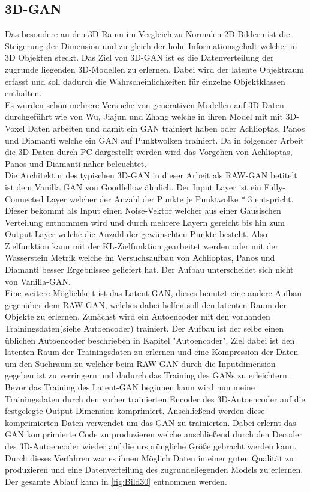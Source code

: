 \documentclass{llncs}
\begin{document}
\subsection{3D-GAN}

Das besondere an den 3D Raum im Vergleich zu Normalen 2D Bildern ist die Steigerung der Dimension und zu gleich der hohe Informationsgehalt welcher in 3D Objekten steckt. Das Ziel von 3D-GAN ist es die Datenverteilung der zugrunde liegenden 3D-Modellen zu erlernen. Dabei wird der latente Objektraum erfasst und soll dadurch die Wahrscheinlichkeiten für einzelne Objektklassen enthalten. 
\\
Es wurden schon mehrere Versuche von generativen Modellen auf 3D Daten durchgeführt wie von Wu, Jiajun und Zhang \cite{3d} welche in ihren Model mit mit 3D-Voxel Daten arbeiten und damit ein GAN trainiert haben oder Achlioptas, Panos und Diamanti\cite{3dgan} welche ein GAN auf Punktwolken trainiert. Da in folgender Arbeit die 3D-Daten durch PC dargestellt werden wird das Vorgehen von Achlioptas, Panos und Diamanti näher beleuchtet.
\\
Die Architektur des typischen 3D-GAN in dieser Arbeit als RAW-GAN betitelt ist dem Vanilla GAN von Goodfellow ähnlich. Der Input Layer ist ein Fully-Connected Layer welcher der Anzahl der Punkte je Punktwolke * 3 entspricht. Dieser bekommt als Input einen Noise-Vektor welcher aus einer Gausischen Verteilung entnommen wird und durch mehrere Layern gereicht bis hin zum Output Layer welche die Anzahl der gewünschten Punkte besteht. Also Zielfunktion kann mit der KL-Zielfunktion gearbeitet werden oder mit der Wasserstein Metrik welche im Versuchsaufbau von Achlioptas, Panos und Diamanti besser Ergebnissee geliefert hat. Der Aufbau unterscheidet sich nicht von Vanilla-GAN. 
\\
Eine weitere Möglichkeit ist das Latent-GAN, dieses benutzt eine andere Aufbau gegenüber dem RAW-GAN, welches dabei helfen soll den latenten Raum der Objekte zu erlernen. Zunächst wird ein Autoencoder mit den vorhanden Trainingsdaten(siehe Autoencoder) trainiert. Der Aufbau ist der selbe einen üblichen Autoencoder beschrieben in Kapitel "Autoencoder". Ziel dabei ist den latenten Raum der Trainingsdaten zu erlernen und eine Kompression der Daten um den Suchraum zu  welcher beim RAW-GAN durch die Inputdimension gegeben ist zu verringern und dadurch das Training des GANs zu erleichtern. 
\\
Bevor das Training des Latent-GAN beginnen kann wird nun meine Trainingsdaten durch den vorher trainierten Encoder des 3D-Autoencoder auf die festgelegte Output-Dimension komprimiert. Anschließend werden diese komprimierten Daten verwendet um das GAN zu trainierten. Dabei erlernt das GAN komprimierte Code zu produzieren welche anschließend durch den Decoder des 3D-Autoencoder wieder auf die ursprüngliche Größe gebracht werden kann. Durch dieses Verfahren war es ihnen Möglich Daten in einer guten Qualität zu produzieren und eine Datenverteilung des zugrundeliegenden Models zu erlernen. Der gesamte Ablauf kann in \ref{fig:Bild30} entnommen werden. 
\end{document}
